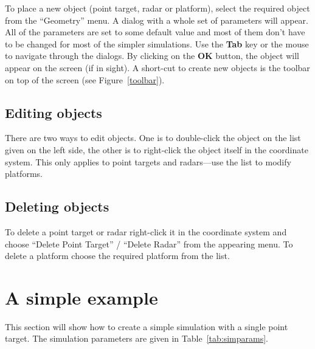 To place a new object (point target, radar or platform), select the required
object from the ``Geometry'' menu. A dialog with a whole set of parameters
will appear. All of the parameters are set to some default value and most of
them don't have to be changed for most of the simpler simulations. Use the 
\textbf{Tab} key or the mouse to navigate through the dialogs. By clicking
on the \textbf{OK} button, the object will appear on the screen (if in
sight). A short-cut to create new objects is the toolbar on top of the
screen (see Figure~\ref{toolbar}).


\subsection{Editing objects}

There are two ways to edit objects. One is to double-click the object on the
list given on the left side, the other is to right-click the object itself
in the coordinate system. This only applies to point targets and
radars---use the list to modify platforms.

\subsection{Deleting objects}

To delete a point target or radar right-click it in the coordinate system
and choose ``Delete Point Target'' / ``Delete Radar'' from the appearing
menu. To delete a platform choose the required platform from the list.

\section{A simple example}

This section will show how to create a simple simulation with a single point
target. The simulation parameters are given in Table~\ref{tab:simparams}.

